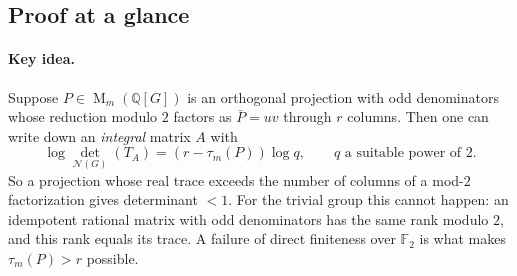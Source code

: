 \documentclass[11pt]{article}
\theoremstyle{remark}
\numberwithin{equation}{section}
\newcommand{\F}{\mathbb F}
\newcommand{\Q}{\mathbb Q}
\newcommand{\Mat}{\operatorname{M}}
\newcommand{\N}{\mathcal N}
\begin{document}
\subsection{Proof at a glance}
\label{subsec:glance}

\paragraph{Key idea.}
Suppose $P\in\Mat_m(\Q[G])$ is an orthogonal projection with odd denominators whose reduction modulo $2$ factors as $\bar P=uv$ through $r$ columns. Then one can write down an \emph{integral} matrix $A$ with
\[
 \log\det_{\N(G)}(T_A)=(r-\tau_m(P))\log q,\qquad q\text{ a suitable power of }2 .
\]
So a projection whose real trace exceeds the number of columns of a mod-$2$ factorization gives determinant $<1$. For the trivial group this cannot happen: an idempotent rational matrix with odd denominators has the same rank modulo $2$, and this rank equals its trace. A failure of direct finiteness over $\F_2$ is what makes $\tau_m(P)>r$ possible.
\end{document}
